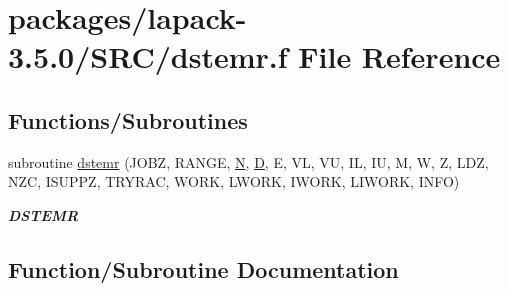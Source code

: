 \hypertarget{dstemr_8f}{}\section{packages/lapack-\/3.5.0/\+S\+R\+C/dstemr.f File Reference}
\label{dstemr_8f}
\subsection*{Functions/\+Subroutines}
\begin{DoxyCompactItemize}
\item 
subroutine \hyperlink{dstemr_8f_a14daa3ac4e7b5d3712244f54ce40cc92}{dstemr} (J\+O\+B\+Z, R\+A\+N\+G\+E, \hyperlink{polmisc_8c_a0240ac851181b84ac374872dc5434ee4}{N}, \hyperlink{odrpack_8h_a7dae6ea403d00f3687f24a874e67d139}{D}, E, V\+L, V\+U, I\+L, I\+U, M, W, Z, L\+D\+Z, N\+Z\+C, I\+S\+U\+P\+P\+Z, T\+R\+Y\+R\+A\+C, W\+O\+R\+K, L\+W\+O\+R\+K, I\+W\+O\+R\+K, L\+I\+W\+O\+R\+K, I\+N\+F\+O)
\begin{DoxyCompactList}\small\item\em {\bfseries D\+S\+T\+E\+M\+R} \end{DoxyCompactList}\end{DoxyCompactItemize}


\subsection{Function/\+Subroutine Documentation}
\hypertarget{dstemr_8f_a14daa3ac4e7b5d3712244f54ce40cc92}{}
